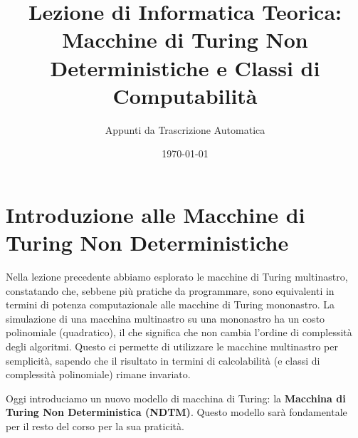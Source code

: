 \documentclass[a4paper]{article}
\title{Lezione di Informatica Teorica: Macchine di Turing Non Deterministiche e Classi di Computabilità}
\author{Appunti da Trascrizione Automatica}
\date{\today}
\theoremstyle{definition} %
\begin{document}
\maketitle
\tableofcontents
\newpage

\section{Introduzione alle Macchine di Turing Non Deterministiche}

Nella lezione precedente abbiamo esplorato le macchine di Turing multinastro, constatando che, sebbene più pratiche da programmare, sono equivalenti in termini di potenza computazionale alle macchine di Turing mononastro. La simulazione di una macchina multinastro su una mononastro ha un costo polinomiale (quadratico), il che significa che non cambia l'ordine di complessità degli algoritmi. Questo ci permette di utilizzare le macchine multinastro per semplicità, sapendo che il risultato in termini di calcolabilità (e classi di complessità polinomiale) rimane invariato.

Oggi introduciamo un nuovo modello di macchina di Turing: la \textbf{Macchina di Turing Non Deterministica (NDTM)}. Questo modello sarà fondamentale per il resto del corso per la sua praticità.
\end{document}
